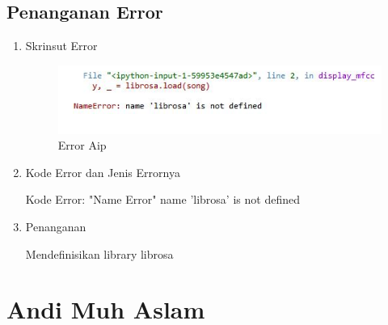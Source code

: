 \begin{enumerate}
\subsection{Penanganan Error}
\begin{enumerate}
\item Skrinsut Error
\begin{figure}[ht]
\centering
\includegraphics[scale=0.7]{figures/AIP/erroraip.PNG}
\caption{ Error Aip}
\label{6}
\end{figure}
\item Kode Error dan Jenis Errornya
\par Kode Error: "Name Error" name 'librosa' is not defined
\item Penanganan
\par Mendefinisikan library librosa

\end{enumerate}
\end{enumerate}





\section{Andi Muh Aslam}
